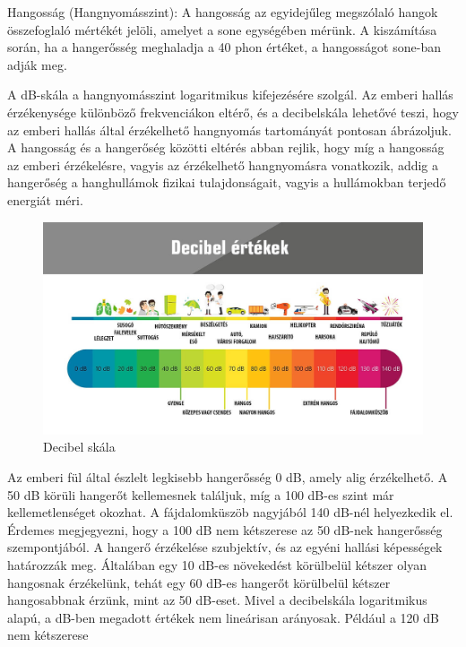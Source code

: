 Hangosság (Hangnyomásszint):
A hangosság az egyidejűleg megszólaló hangok összefoglaló mértékét jelöli, amelyet a sone egységében mérünk. 
A kiszámítása során, ha a hangerősség meghaladja a 40 phon értéket, a hangosságot sone-ban adják meg.

A dB-skála a hangnyomásszint logaritmikus kifejezésére szolgál. Az emberi hallás érzékenysége különböző 
frekvenciákon eltérő, és a decibelskála lehetővé teszi, hogy az emberi hallás által 
érzékelhető hangnyomás tartományát pontosan ábrázoljuk.
A hangosság és a hangerőség közötti eltérés abban rejlik, hogy míg a hangosság az emberi érzékelésre, 
vagyis az érzékelhető hangnyomásra vonatkozik, addig a hangerőség a hanghullámok 
fizikai tulajdonságait, vagyis a hullámokban terjedő energiát méri.
\begin{figure}[H]
	\centering
	\includegraphics[width=\linewidth, keepaspectratio]{figures/db_scale.jpg}
    \caption{Decibel skála~\cite{DECIBELSCALE}}\label{fig:db_scale}
\end{figure}
Az emberi fül által észlelt legkisebb hangerősség 0 dB, amely alig érzékelhető. 
A 50 dB körüli hangerőt kellemesnek találjuk, míg a 100 dB-es szint már kellemetlenséget 
okozhat. A fájdalomküszöb nagyjából 140 dB-nél helyezkedik el. Érdemes megjegyezni, hogy 
a 100 dB nem kétszerese az 50 dB-nek hangerősség szempontjából. A hangerő érzékelése 
szubjektív, és az egyéni hallási képességek határozzák meg. Általában egy 10 dB-es 
növekedést körülbelül kétszer olyan hangosnak érzékelünk, tehát egy 60 dB-es hangerőt 
körülbelül kétszer hangosabbnak érzünk, mint az 50 dB-eset. Mivel a decibelskála logaritmikus 
alapú, a dB-ben megadott értékek nem lineárisan arányosak. Például a 120 dB nem kétszerese 
